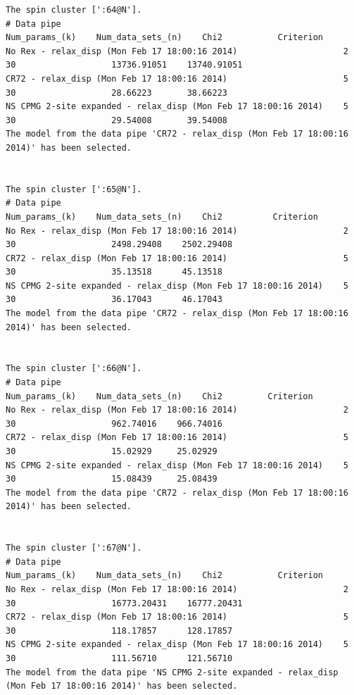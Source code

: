 \begin{lstlisting}[basicstyle=\ttfamily \tiny,language=relax_log,numbers=none]
The spin cluster [':64@N'].
# Data pipe                                                        Num_params_(k)    Num_data_sets_(n)    Chi2           Criterion      
No Rex - relax_disp (Mon Feb 17 18:00:16 2014)                     2                 30                   13736.91051    13740.91051    
CR72 - relax_disp (Mon Feb 17 18:00:16 2014)                       5                 30                   28.66223       38.66223       
NS CPMG 2-site expanded - relax_disp (Mon Feb 17 18:00:16 2014)    5                 30                   29.54008       39.54008       
The model from the data pipe 'CR72 - relax_disp (Mon Feb 17 18:00:16 2014)' has been selected.


The spin cluster [':65@N'].
# Data pipe                                                        Num_params_(k)    Num_data_sets_(n)    Chi2          Criterion     
No Rex - relax_disp (Mon Feb 17 18:00:16 2014)                     2                 30                   2498.29408    2502.29408    
CR72 - relax_disp (Mon Feb 17 18:00:16 2014)                       5                 30                   35.13518      45.13518      
NS CPMG 2-site expanded - relax_disp (Mon Feb 17 18:00:16 2014)    5                 30                   36.17043      46.17043      
The model from the data pipe 'CR72 - relax_disp (Mon Feb 17 18:00:16 2014)' has been selected.


The spin cluster [':66@N'].
# Data pipe                                                        Num_params_(k)    Num_data_sets_(n)    Chi2         Criterion    
No Rex - relax_disp (Mon Feb 17 18:00:16 2014)                     2                 30                   962.74016    966.74016    
CR72 - relax_disp (Mon Feb 17 18:00:16 2014)                       5                 30                   15.02929     25.02929     
NS CPMG 2-site expanded - relax_disp (Mon Feb 17 18:00:16 2014)    5                 30                   15.08439     25.08439     
The model from the data pipe 'CR72 - relax_disp (Mon Feb 17 18:00:16 2014)' has been selected.


The spin cluster [':67@N'].
# Data pipe                                                        Num_params_(k)    Num_data_sets_(n)    Chi2           Criterion      
No Rex - relax_disp (Mon Feb 17 18:00:16 2014)                     2                 30                   16773.20431    16777.20431    
CR72 - relax_disp (Mon Feb 17 18:00:16 2014)                       5                 30                   118.17857      128.17857      
NS CPMG 2-site expanded - relax_disp (Mon Feb 17 18:00:16 2014)    5                 30                   111.56710      121.56710      
The model from the data pipe 'NS CPMG 2-site expanded - relax_disp (Mon Feb 17 18:00:16 2014)' has been selected.
\end{lstlisting}

